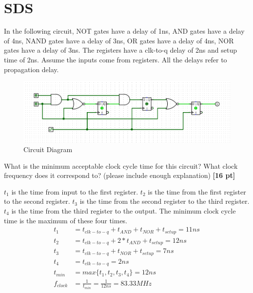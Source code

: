 \documentclass[a4paper]{article}
\begin{document}
\newpage
\section{SDS}
In the following circuit, NOT gates have a delay of 1ns, AND gates have a delay of 4ns, NAND gates have a delay of 3ns, OR gates have a delay of 4ns, NOR gates have a delay of 3ns. The registers have a clk-to-q delay of 2ns and setup time of 2ns. Assume the inputs
come from registers. All the delays refer to propagation delay.\\

\begin{figure}[hp]
    \centering
    \includegraphics[width=1.0\textwidth]{Q2.png}
    \caption{Circuit Diagram}
    \label{fig:q2}
\end{figure}

What is the minimum acceptable clock cycle time for this circuit? What
clock frequency does it correspond to? (please include enough explanation) \textbf{[16 pt]}

\begin{answer}[Question 2]
    $t_1$ is the time from input to the first register. $t_2$ is the time from the first register to the second register. $t_3$ is the time from the second register to the third register. $t_4$ is the time from the third register to the output. The minimum clock cycle time is the maximum of these four times.
    \begin{align*}
        t_1       & = t_{clk-to-q} + t_{AND} + t_{NOR} + t_{setup} = 11 ns \\
        t_2       & = t_{clk-to-q} + 2 * t_{AND} + t_{setup} = 12ns        \\
        t_3       & = t_{clk-to-q} + t_{NOR} + t_{setup} = 7ns             \\
        t_4       & = t_{clk-to-q} = 2ns                                   \\
        t_{min}   & = max\{t_1, t_2, t_3, t_4\} = 12 ns                    \\
        f_{clock} & = \frac{1}{t_{min}} = \frac{1}{12ns} = 83.33MHz
    \end{align*}
\end{answer}
\end{document}
